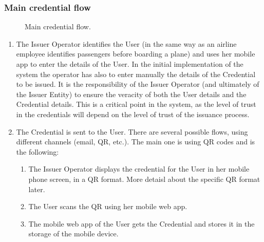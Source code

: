 \documentclass[a4paper,12pt,english]{sphinxhowto}
\begin{document}
\subsubsection{Main credential flow}
\label{\detokenize{ssi/privacycred:main-credential-flow}}
\begin{figure}[htbp]
\centering
\capstart

\noindent{}
\caption{Main credential flow.}\label{\detokenize{ssi/privacycred:id3}}\end{figure}
\begin{enumerate}
%
\item {} 
\sphinxAtStartPar
{}

\sphinxAtStartPar
The Issuer Operator identifies the User (in the same way as an airline employee identifies passengers before boarding a plane) and uses her mobile app to enter the details of the User. In the initial implementation of the system the operator has also to enter manually the details of the Credential to be issued. It is the responsibility of the Issuer Operator (and ultimately of the Issuer Entity) to ensure the veracity of both the User details and the Credential details. This is a critical point in the system, as the level of trust in the credentials will depend on the level of trust of the issuance process.

\item {} 
\sphinxAtStartPar
{}

\sphinxAtStartPar
The Credential is sent to the User. There are several possible flows, using different channels (email, QR, etc.). The main one is using QR codes and is the following:
\begin{enumerate}
%
\item {} 
\sphinxAtStartPar
The Issuer Operator displays the credential for the User in her mobile phone screen, in a QR format. More detaisl about the specific QR format later.

\item {} 
\sphinxAtStartPar
The User scans the QR using her mobile web app.

\item {} 
\sphinxAtStartPar
The mobile web app of the User gets the Credential and stores it in the storage of the mobile device.


\end{enumerate}
\end{enumerate}
\end{document}
